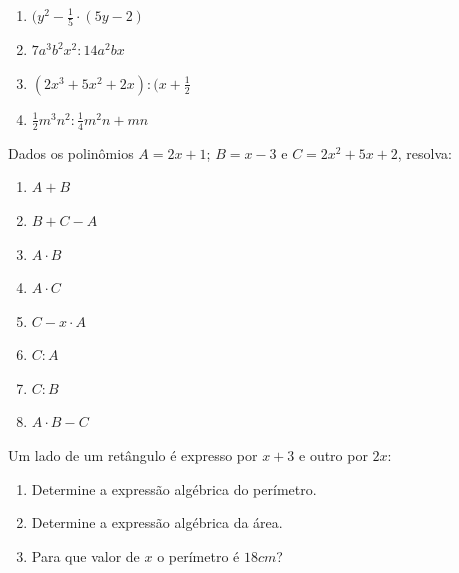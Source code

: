 \begin{description}
\begin{multicols}{2}
\begin{enumerate}[label=\alph*)]
    \item $(y^2-\frac{1}{5} \cdot (5y-2)$
    
    \item $7a^3b^2x^2 : 14a^2bx$
    
    \item $(2x^3+5x^2+2x) : (x+\frac{1}{2}$
    
    \item $\frac{1}{2}m^3n^2 : \frac{1}{4}m^2n+mn$
\end{enumerate}

\end{multicols}

\item[\thesubsection.\theexercicio] Dados os polinômios $A = 2x+1$; $B = x-3$ e $C = 2x^2+5x+2$, resolva:

\begin{multicols}{4}

\begin{enumerate}[label=\alph*)]
    \item $A+B$
    
    \item $B+C-A$
    
    \item $A \cdot B$
    
    \item $A \cdot C$
    
    \item $C - x \cdot A$
    
    \item $C:A$
    
    \item $C:B$
    
    \item $A \cdot B-C$
\end{enumerate}

\end{multicols}

\item[\thesubsection.\theexercicio] Um lado de um retângulo é expresso por $x +3$ e outro por $2x$:

\begin{enumerate}[label=\alph*)]
\item Determine a expressão algébrica do perímetro.

\item Determine a expressão algébrica da área.

\item Para que valor de $x$ o perímetro é $18cm$?


\end{enumerate}
\end{description}
